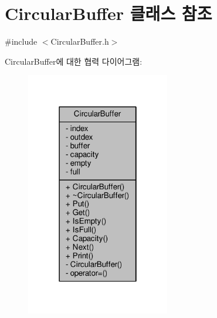 \hypertarget{class_circular_buffer}{}\section{Circular\+Buffer 클래스 참조}
\label{class_circular_buffer}


{\ttfamily \#include $<$Circular\+Buffer.\+h$>$}



Circular\+Buffer에 대한 협력 다이어그램\+:
\nopagebreak
\begin{figure}[H]
\begin{center}
\leavevmode
\includegraphics[width=178pt]{class_circular_buffer__coll__graph}
\end{center}
\end{figure}
